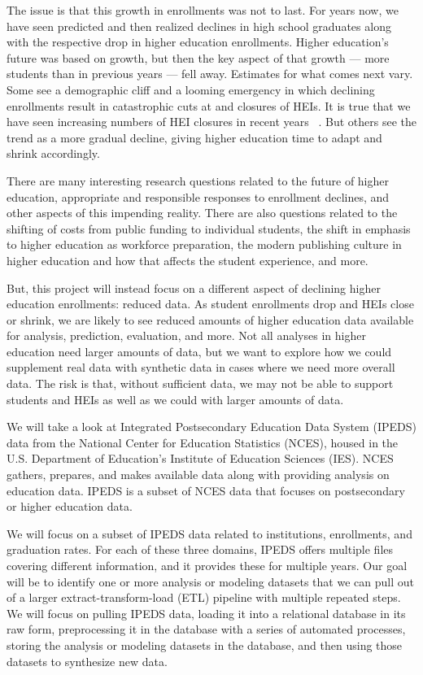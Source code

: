 \documentclass[sigconf, authorversion, nonacm]{acmart}
\begin{document}
    The issue is that this growth in enrollments was not to last. For years now, we have seen predicted and then realized declines in high school graduates along with the respective drop in higher education enrollments. Higher education's future was based on growth, but then the key aspect of that growth --- more students than in previous years --- fell away. Estimates for what comes next vary. Some see a demographic cliff and a looming emergency in which declining enrollments result in catastrophic cuts at and closures of HEIs. It is true that we have seen increasing numbers of HEI closures in recent years ~\cite{hechingercollegeclosures}. But others see the trend as a more gradual decline, giving higher education time to adapt and shrink accordingly. \cite{insidehighereddemographiccliff}

    There are many interesting research questions related to the future of higher education, appropriate and responsible responses to enrollment declines, and other aspects of this impending reality. There are also questions related to the shifting of costs from public funding to individual students, the shift in emphasis to higher education as workforce preparation, the modern publishing culture in higher education and how that affects the student experience, and more.

    But, this project will instead focus on a different aspect of declining higher education enrollments: reduced data. As student enrollments drop and HEIs close or shrink, we are likely to see reduced amounts of higher education data available for analysis, prediction, evaluation, and more. Not all analyses in higher education need larger amounts of data, but we want to explore how we could supplement real data with synthetic data in cases where we need more overall data. The risk is that, without sufficient data, we may not be able to support students and HEIs as well as we could with larger amounts of data.

    We will take a look at Integrated Postsecondary Education Data System (IPEDS) data from the National Center for Education Statistics (NCES), housed in the U.S. Department of Education's Institute of Education Sciences (IES). NCES gathers, prepares, and makes available data along with providing analysis on education data. IPEDS is a subset of NCES data that focuses on postsecondary or higher education data. \cite{ipeds}

    We will focus on a subset of IPEDS data related to institutions, enrollments, and graduation rates. For each of these three domains, IPEDS offers multiple files covering different information, and it provides these for multiple years. Our goal will be to identify one or more analysis or modeling datasets that we can pull out of a larger extract-transform-load (ETL) pipeline with multiple repeated steps. We will focus on pulling IPEDS data, loading it into a relational database in its raw form, preprocessing it in the database with a series of automated processes, storing the analysis or modeling datasets in the database, and then using those datasets to synthesize new data.
\end{document}
